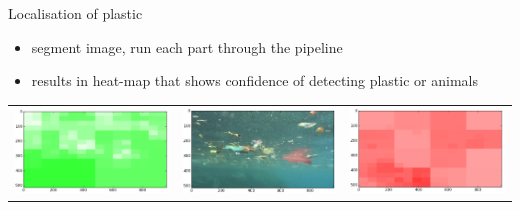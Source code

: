 \documentclass{beamer}
\begin{document}
    \begin{frame}{Localisation of plastic}
    \begin{block}{}
    \begin{itemize}
    \item segment image, run each part through the pipeline
    \item results in heat-map that shows confidence of detecting plastic or animals
    \end{itemize}
    \end{block}
\def\segwidth{.3\textwidth}
\begin{tabular}{ccc}

\includegraphics[keepaspectratio=true,width=\segwidth]{images/segment/6_01__animals__.png} &
\includegraphics[keepaspectratio=true,width=\segwidth]{images/segment/6_01__image__.png} &
\includegraphics[keepaspectratio=true,width=\segwidth]{images/segment/6_01__plastic__.png} \\

\end{tabular}
\end{frame}
\end{document}
